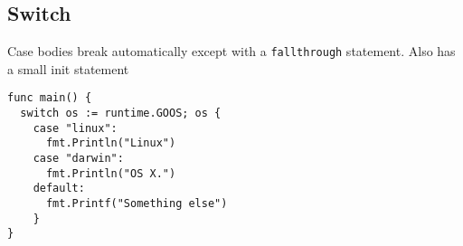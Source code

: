 \subsection{Switch}
Case bodies break automatically except with a \texttt{fallthrough} statement. Also has a small init statement
\begin{lstlisting}
func main() {
  switch os := runtime.GOOS; os {
    case "linux":
      fmt.Println("Linux")
    case "darwin":
      fmt.Println("OS X.")
    default:
      fmt.Printf("Something else")
    }
}
\end{lstlisting}
